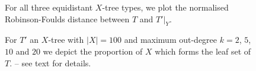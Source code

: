 \begin{figure}
  \centering
  \begin{tikzpicture}
    
  \end{tikzpicture}
  \endpgfgraphicnamed  
  \caption{For all three equidistant $X$-tree types, we plot the normalised
    Robinson-Foulds distance between $T$ and $T'|_Y$.}
  \label{fig:rob-foulds-shapes}
\end{figure}

\begin{figure}
  \centering
  \begin{tikzpicture}
    
  \end{tikzpicture}
  \endpgfgraphicnamed  
  \caption{For $T'$ an $X$-tree with $|X|=100$ and maximum out-degree $k= 2$,
    $5$, $10$ and $20$ we depict the proportion of $X$ which forms the leaf
    set of $T$. -- see text for details.  }
  \label{fig:simulation-nleaves}
\end{figure}

